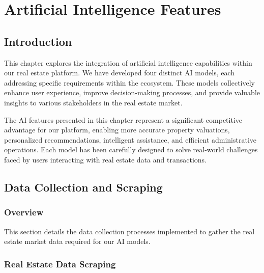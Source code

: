 \chapter{Artificial Intelligence Features}


\section*{Introduction}

This chapter explores the integration of artificial intelligence capabilities within our real estate platform. We have developed four distinct AI models, each addressing specific requirements within the ecosystem. These models collectively enhance user experience, improve decision-making processes, and provide valuable insights to various stakeholders in the real estate market.

The AI features presented in this chapter represent a significant competitive advantage for our platform, enabling more accurate property valuations, personalized recommendations, intelligent assistance, and efficient administrative operations. Each model has been carefully designed to solve real-world challenges faced by users interacting with real estate data and transactions.

\section{Data Collection and Scraping}
\subsection{Overview}
This section details the data collection processes implemented to gather the real estate market data required for our AI models. 

\subsection{Real Estate Data Scraping}
